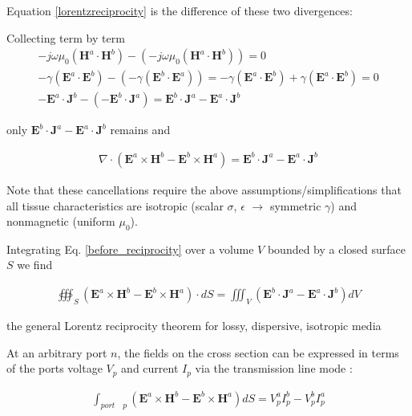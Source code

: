 Equation \eqref{lorentzreciprocity} is the difference of these two divergences:

Collecting term by term 
\begin{align}
    -j\omega\mu_0 (\mathbf{H}^a \cdot \mathbf{H}^b) - (-j \omega \mu_0 (\mathbf{H}^a \cdot \mathbf{H}^b)) = 0 \\
    -\gamma (\mathbf{E}^a \cdot \mathbf{E}^b) - (-\gamma (\mathbf{E}^b \cdot \mathbf{E}^a)) = -\gamma (\mathbf{E}^a \cdot \mathbf{E}^b) +\gamma (\mathbf{E}^a \cdot \mathbf{E}^b) = 0 \\
    -\mathbf{E}^a \cdot \mathbf{J}^{b} -(-\mathbf{E}^b \cdot \mathbf{J}^a) = \mathbf{E}^b \cdot \mathbf{J}^a - \mathbf{E}^a \cdot \mathbf{J}^b
\end{align}

only $\mathbf{E}^b \cdot \mathbf{J}^a - \mathbf{E}^a \cdot \mathbf{J}^b$ remains and 

\begin{align}
\label{before_reciprocity}
    \nabla \cdot (\mathbf{E}^a \times \mathbf{H}^b - \mathbf{E}^b \times \mathbf{H}^a) = \mathbf{E}^b \cdot \mathbf{J}^a - \mathbf{E}^a \cdot \mathbf{J}^b
\end{align}

Note that these cancellations require the above assumptions/simplifications that all tissue characteristics are isotropic (scalar $\sigma$, $\epsilon$ $\rightarrow$ symmetric $\gamma$) and nonmagnetic (uniform $\mu_0$).

Integrating Eq. \eqref{before_reciprocity} over a volume $V$ bounded by a closed surface $S$ we find 

\begin{align}
    \label{reciprocity}
    \oiiint_{S} (\mathbf{E}^a \times \mathbf{H}^b - \mathbf{E}^b \times \mathbf{H}^a) \cdot dS = \iiint_{V} (\mathbf{E}^b \cdot \mathbf{J}^a - \mathbf{E}^a \cdot \mathbf{J}^b) dV
\end{align}

the general Lorentz reciprocity theorem for lossy, dispersive, isotropic media \cite{Harrington2001Time-harmonicFields}

At an arbitrary port $n$, the fields on the cross section can be expressed in terms of the ports voltage $V_p$ and current $I_p$ via the transmission line mode \cite{Harrington2001Time-harmonicFields}:

\begin{align}
    \label{harringtonTLM}
    \int_{port \quad p}(\mathbf{E}^a \times \mathbf{H}^b - \mathbf{E}^b \times \mathbf{H}^a)dS = V_p^a I_p^b - V_p^b I_p^a
\end{align}

